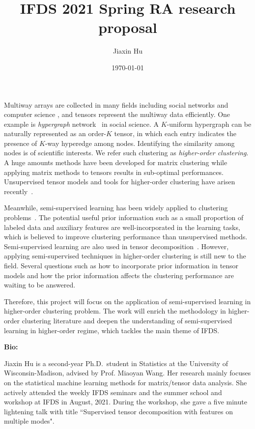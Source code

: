 \documentclass[11pt]{article}
\title{IFDS 2021 Spring RA research proposal}
\date{\today}
\author{%
Jiaxin Hu
}
\theoremstyle{plain}
\theoremstyle{definition}
\begin{document}

\maketitle

Multiway arrays are collected in many fields including social networks \citep{anandkumar2014tensor} and computer science \citep{koniusz2016sparse}, and tensors represent the multiway data efficiently. One example is \emph{hypergraph} network~\citep{ghoshdastidar2017uniform,ghoshdastidar2017consistency,ahn2019community,ke2019community} in social science. A $K$-uniform hypergraph can be naturally represented as an order-$K$ tensor, in which each entry indicates the presence of $K$-way hyperedge among nodes. Identifying the similarity among nodes is of scientific interests.  We refer such clustering as \emph{higher-order clustering}. A huge amounts methods have been developed for matrix clustering while applying matrix methods to tensors results in sub-optimal performances. Unsupervised tensor models and tools for higher-order clustering have arisen recently~\citep{ wang2019multiway,chi2020provable,han2020exact}. 

Meanwhile, semi-supervised learning has been widely applied to clustering problems~\citep{zhu2003semi,yang2014unified}. The potential useful prior information such as a small proportion of labeled data and auxiliary features are well-incorporated in the learning tasks, which is believed to improve clustering performance than unsupervised methods. Semi-supervised learning are also used in tensor decomposition~\citep{cao2016semi,hu2021generalized}. However, applying semi-supervised techniques in higher-order clustering is still new to the field. Several questions such as how to incorporate prior information in tensor models and how the prior information affects the clustering performance are waiting to be answered. 

Therefore, this project will focus on the application of semi-supervised learning in higher-order clustering problem. The work will enrich the methodology in higher-order clustering literature and deepen the understanding of semi-supervised learning in higher-order regime, which tackles the main theme of IFDS. 


\textbf{Bio:} 

Jiaxin Hu is a second-year Ph.D.\ student in Statistics at the University of Wisconsin-Madison, advised by Prof. Miaoyan Wang. Her research mainly focuses on the statistical machine learning methods for matrix/tensor data analysis. She actively attended the weekly IFDS seminars and the summer school and workshop at IFDS in August, 2021. During the workshop, she gave a five minute lightening talk with title ``Supervised tensor decomposition with features on multiple modes". 



\end{document}
